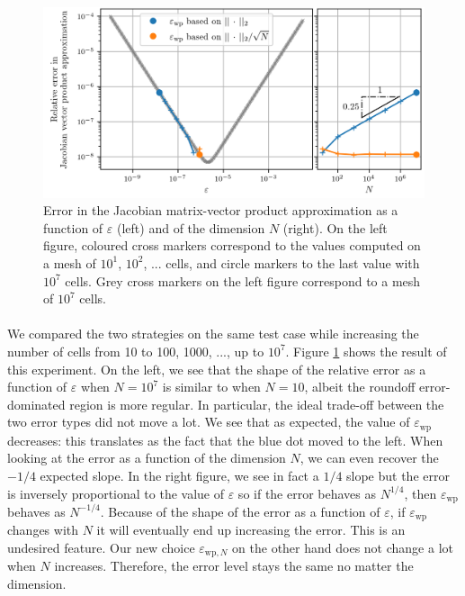       \begin{figure}
        \centering
        \includegraphics[width=\textwidth]{figures/epsilon_Burgers.png}
        \caption{
          Error in the Jacobian matrix-vector product approximation as a function of $\varepsilon$ (left) and of the dimension $N$ (right).
          On the left figure, coloured cross markers correspond to the values computed on a mesh of $10^1$, $10^2$, ... cells, and circle markers to the last value with $10^7$ cells.
          Grey cross markers on the left figure correspond to a mesh of $10^7$ cells.
        }
        \label{fig:epsilon_burgers}
      \end{figure}

      \paragraph{}
      We compared the two strategies on the same test case while increasing the number of cells from 10 to 100, 1000, ..., up to $10^7$.
      Figure \ref{fig:epsilon_burgers} shows the result of this experiment.
      On the left, we see that the shape of the relative error as a function of $\varepsilon$ when $N = 10^7$ is similar to when $N = 10$, albeit the roundoff error-dominated region is more regular.
      In particular, the ideal trade-off between the two error types did not move a lot.
      We see that as expected, the value of $\varepsilon_\textrm{wp}$ decreases: this translates as the fact that the blue dot moved to the left.
      When looking at the error as a function of the dimension $N$, we can even recover the $-1/4$ expected slope.
      In the right figure, we see in fact a $1/4$ slope but the error is inversely proportional to the value of $\varepsilon$ so if the error behaves as $N^{1/4}$, then $\varepsilon_\textrm{wp}$ behaves as $N^{-1/4}$.
      Because of the shape of the error as a function of $\varepsilon$, if $\varepsilon_\textrm{wp}$ changes with $N$ it will eventually end up increasing the error.
      This is an undesired feature.
      Our new choice $\varepsilon_{\textrm{wp}, N}$ on the other hand does not change a lot when $N$ increases.
      Therefore, the error level stays the same no matter the dimension.

